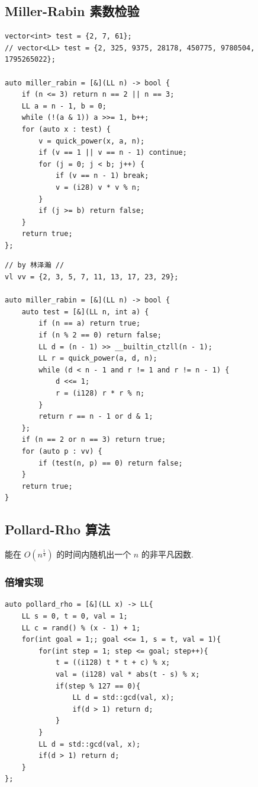 \documentclass[UTF8, a4paper, titlepage, twoside]{ctexart}
\begin{document}
\subsection{ Miller-Rabin 素数检验 }
\begin{lstlisting}
vector<int> test = {2, 7, 61};
// vector<LL> test = {2, 325, 9375, 28178, 450775, 9780504, 1795265022};

auto miller_rabin = [&](LL n) -> bool {
    if (n <= 3) return n == 2 || n == 3;
    LL a = n - 1, b = 0;
    while (!(a & 1)) a >>= 1, b++;
    for (auto x : test) {
        v = quick_power(x, a, n);
        if (v == 1 || v == n - 1) continue;
        for (j = 0; j < b; j++) {
            if (v == n - 1) break;
            v = (i28) v * v % n;
        }
        if (j >= b) return false;
    }
    return true;
};
\end{lstlisting}

\begin{lstlisting}
// by 林泽瀚 //
vl vv = {2, 3, 5, 7, 11, 13, 17, 23, 29};

auto miller_rabin = [&](LL n) -> bool {
    auto test = [&](LL n, int a) {
        if (n == a) return true;
        if (n % 2 == 0) return false;
        LL d = (n - 1) >> __builtin_ctzll(n - 1);
        LL r = quick_power(a, d, n);
        while (d < n - 1 and r != 1 and r != n - 1) {
            d <<= 1;
            r = (i128) r * r % n;
        }
        return r == n - 1 or d & 1;
    };
    if (n == 2 or n == 3) return true;
    for (auto p : vv) {
        if (test(n, p) == 0) return false;
    }
    return true;
}
\end{lstlisting}

\subsection{ Pollard-Rho 算法 }
能在 $O(n^{\frac{1}{4}})$ 的时间内随机出一个 $n$ 的非平凡因数.
\subsubsection{ 倍增实现 }
\begin{lstlisting}
auto pollard_rho = [&](LL x) -> LL{
    LL s = 0, t = 0, val = 1;
    LL c = rand() % (x - 1) + 1;
    for(int goal = 1;; goal <<= 1, s = t, val = 1){
        for(int step = 1; step <= goal; step++){
            t = ((i128) t * t + c) % x;
            val = (i128) val * abs(t - s) % x;
            if(step % 127 == 0){
                LL d = std::gcd(val, x);
                if(d > 1) return d;
            }
        }
        LL d = std::gcd(val, x);
        if(d > 1) return d;
    }
};
\end{lstlisting}
\end{document}
